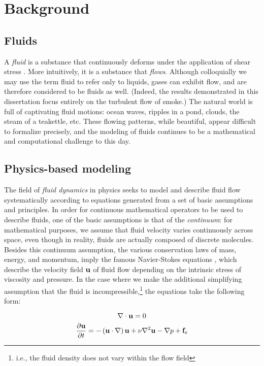\chapter[Background]{Background}
\label{chap:chap3}
\section{Fluids}

A {\em fluid} is a substance that continuously deforms under the application of shear stress \cite{batchelor2000introduction}. More intuitively, it is a substance that {\em flows}. Although colloquially we may use the term fluid to refer only to liquids, gases can exhibit flow, and are therefore considered to be fluids as well. (Indeed, the results demonstrated in this dissertation focus entirely on the turbulent flow of smoke.) The natural world is full of captivating fluid motions: ocean waves, ripples in a pond, clouds, the steam of a teakettle, etc. These flowing patterns, while beautiful, appear difficult to formalize precisely, and the modeling of fluids continues to be a mathematical and computational challenge to this day.

\section{Physics-based modeling}
\label{sec:physics-based}
The field of {\em fluid dynamics} in physics seeks to model and describe fluid flow systematically according to equations generated from a set of basic assumptions and principles. In order for continuous mathematical operators to be used to describe fluids, one of the basic assumptions is that of the {\em continuum}: for mathematical purposes, we assume that fluid velocity varies continuously across space, even though in reality, fluids are actually composed of discrete molecules. Besides this continuum assumption, the various conservation laws of mass, energy, and momentum, imply the famous Navier-Stokes equations \cite{currie2012fundamental}, which describe the velocity field $\mathbf{u}$ of fluid flow depending on the intrinsic stress of viscosity and pressure. In the case where we make the additional simplifying assumption that the fluid is incompressible,\footnote{i.e., the fluid density does not vary within the flow field} the equations take the following form:

\begin{equation}
\label{eq:incompress}
\nabla \cdot \mathbf{u} = 0
\end{equation}
\begin{equation}
\label{eq:momentum}
\frac{\partial \mathbf{u}}{\partial t} = -\left(\mathbf{u} \cdot \nabla \right)\mathbf{u} + \nu \nabla^{2}\mathbf{u} - \nabla{p} + \mathbf{f}_e
\end{equation}

